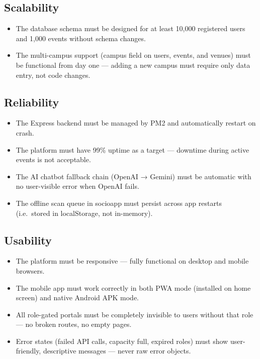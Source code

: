 \documentclass[12pt,a4paper]{article}
\begin{document}
\subsection{Scalability}

\begin{itemize}[leftmargin=*]
    \item The database schema must be designed for at least 10,000 registered users and 1,000 events without schema changes.
    \item The multi-campus support (campus field on users, events, and venues) must be functional from day one — adding a new campus must require only data entry, not code changes.
\end{itemize}

\subsection{Reliability}

\begin{itemize}[leftmargin=*]
    \item The Express backend must be managed by PM2 and automatically restart on crash.
    \item The platform must have 99\% uptime as a target — downtime during active events is not acceptable.
    \item The AI chatbot fallback chain (OpenAI → Gemini) must be automatic with no user-visible error when OpenAI fails.
    \item The offline scan queue in socioapp must persist across app restarts (i.e.\ stored in localStorage, not in-memory).
\end{itemize}

\subsection{Usability}

\begin{itemize}[leftmargin=*]
    \item The platform must be responsive — fully functional on desktop and mobile browsers.
    \item The mobile app must work correctly in both PWA mode (installed on home screen) and native Android APK mode.
    \item All role-gated portals must be completely invisible to users without that role — no broken routes, no empty pages.
    \item Error states (failed API calls, capacity full, expired roles) must show user-friendly, descriptive messages — never raw error objects.
\end{itemize}
\end{document}
